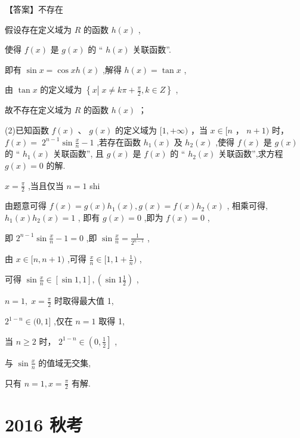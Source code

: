 \documentclass[10pt]{article}
\begin{document}
【答案】不存在

假设存在定义域为 \(R\) 的函数 \(h\left( x\right)\) ,

使得 \(f\left( x\right)\) 是 \(g\left( x\right)\) 的 “ \(h\left( x\right)\) 关联函数”.

即有 \(\sin x = \cos {xh}\left( x\right)\) ,解得 \(h\left( x\right)  = \tan x\) ,

由 \(\tan x\) 的定义域为 \(\left\{  {x\left| {\;x \neq  {k\pi } + \frac{\pi }{2}}\right. ,k \in  Z}\right\}\) ,

故不存在定义域为 \(R\) 的函数 \(h\left( x\right)\) ；

(2)已知函数 \(f\left( x\right)\) 、 \(g\left( x\right)\) 的定义域为 \(\lbrack 1, + \infty )\) ，当 \(x \in  \lbrack n\) ， \(n + 1)\) 时， \(f\left( x\right)  = \; {2}^{n - 1}\sin \frac{x}{n} - 1\) ,若存在函数 \({h}_{1}\left( x\right)\) 及 \({h}_{2}\left( x\right)\) ,使得 \(f\left( x\right)\) 是 \(g\left( x\right)\) 的 “ \({h}_{1}\left( x\right)\) 关联函数”, 且 \(g\left( x\right)\) 是 \(f\left( x\right)\) 的 “ \({h}_{2}\left( x\right)\) 关联函数”,求方程 \(g\left( x\right)  = 0\) 的解.

\(x = \frac{\pi }{2}\) ,当且仅当 \(n = 1\) shi

由题意可得 \(f\left( x\right)  = g\left( x\right) {h}_{1}\left( x\right) ,g\left( x\right)  = f\left( x\right) {h}_{2}\left( x\right)\) , 相乘可得, \({h}_{1}\left( x\right) {h}_{2}\left( x\right)  = 1\) , 即有 \(g\left( x\right)  = 0\) ,即为 \(f\left( x\right)  = 0\) ,

即 \({2}^{n - 1}\sin \frac{x}{n} - 1 = 0\) ,即 \(\sin \frac{x}{n} = \frac{1}{{2}^{n - 1}}\) ,

由 \(x \in  \lbrack n,n + 1)\) ,可得 \(\frac{x}{n} \in  \lbrack 1,1 + \frac{1}{n})\) ,

可得 \(\sin \frac{x}{n} \in  \left\lbrack  {\sin 1,1}\right\rbrack  ,\left( {\sin 1\frac{1}{2}}\right)\) ,

\(n = 1,\;x = \frac{\pi }{2}\) 时取得最大值 1,

\({2}^{1 - n} \in  (0,1\rbrack\) ,仅在 \(n = 1\) 取得 1,

当 \(n \geq  2\) 时， \({2}^{1 - n} \in  \left( {0,\frac{1}{2}}\right\rbrack\) ,

与 \(\sin \frac{x}{n}\) 的值域无交集,

只有 \(n = 1,x = \frac{\pi }{2}\) 有解.

\section*{2016 秋考}
\end{document}
